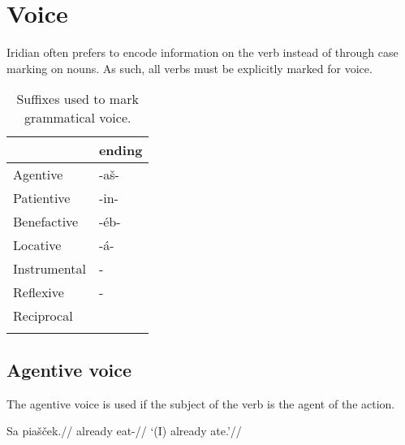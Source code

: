\section{Voice}

Iridian often prefers to encode information on the verb instead of through case marking on nouns. As such, all verbs must be explicitly marked for voice.
\begin{table}[h!]
	\small \centering
	\caption{Suffixes used to mark grammatical voice.}
	\begin{tabu} to 0.8\textwidth{YM}
		\toprule
		&{\sc ending}\\
		\midrule
		Agentive	& -a\v{s}-\\ \addlinespace
		Patientive	& -in-\\ \addlinespace
		Benefactive	& -\'eb-\\ \addlinespace
		Locative	& -á-\\ \addlinespace
		Instrumental& -\\ \addlinespace
		Reflexive	& -\\ \addlinespace
		Reciprocal	& \\ \addlinespace
		\bottomrule
	\end{tabu}
\end{table}


\subsection{Agentive voice}
\par The agentive voice is used if the subject of the verb is the agent of the action.

\pex
\begingl
\gla Sa pia\v{s}\v{c}ek.//
\glb already eat-//
\glft `(I) already ate.'//
\endgl
\xe

